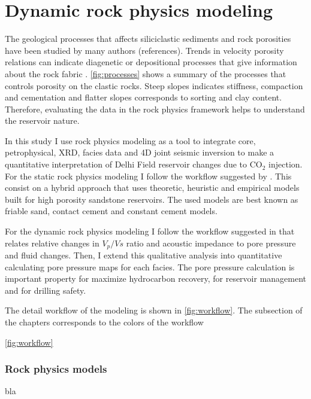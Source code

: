 \chapter{Dynamic rock physics modeling}

The geological processes that affects siliciclastic sediments and rock porosities have been 
studied by many authors (references). Trends in velocity 
porosity relations can indicate diagenetic or depositional processes that 
give information about the rock fabric \citep{ref:avseth}. \ref{fig:processes} shows 
a summary of the processes that controls porosity on the clastic rocks. Steep slopes
indicates stiffness, compaction and cementation and flatter slopes corresponds
to sorting and clay content. Therefore, evaluating the data in the rock physics framework
helps to understand the reservoir nature.
 

In this study I use rock physics modeling as a tool to integrate  core, petrophysical, 
XRD, facies data and 4D joint seismic inversion to make a quantitative
interpretation of Delhi Field reservoir changes due to CO$_2$ injection.
For the static rock physics modeling I follow the workflow suggested by \cite{ref:avseth}. This 
consist on a hybrid  approach that uses theoretic, heuristic and empirical
models built for high porosity sandstone reservoirs. The used models are best known as friable
sand, contact cement and constant cement models. 

For the dynamic rock physics modeling I follow the workflow suggested in \cite{ref:dynamic} that
relates relative changes in $V_{p}/V{s}$ ratio and acoustic impedance to pore pressure
and fluid changes. Then, I extend this qualitative analysis into quantitative calculating
pore pressure maps for each facies. The pore pressure calculation is important property for maximize
hydrocarbon recovery, for reservoir management and for drilling safety.

The detail workflow of the modeling is shown in \ref{fig:workflow}.
The subsection of the chapters corresponds to the colors of the workflow

\ref{fig:workflow}


\subsection{Rock physics models}
bla

